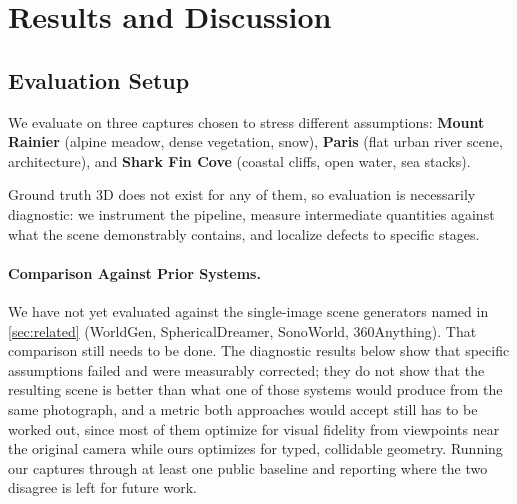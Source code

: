 \section{Results and Discussion}
\label{sec:results}

\subsection{Evaluation Setup}

We evaluate on three captures chosen to stress different assumptions:
\textbf{Mount Rainier} (alpine meadow, dense vegetation, snow),
\textbf{Paris} (flat urban river scene, architecture), and
\textbf{Shark Fin Cove} (coastal cliffs, open water, sea stacks).

Ground truth 3D does not exist for any of them, so evaluation is necessarily
diagnostic: we instrument the pipeline, measure intermediate quantities against
what the scene demonstrably contains, and localize defects to specific stages.

\paragraph{Comparison Against Prior Systems.} We have not yet evaluated against the
single-image scene generators named in \cref{sec:related} (WorldGen,
SphericalDreamer, SonoWorld, 360Anything). That comparison still needs to be done.
The diagnostic results below show that specific assumptions failed and were
measurably corrected; they do not show that the resulting scene is better than
what one of those systems would produce from the same photograph, and a metric
both approaches would accept still has to be worked out, since most of them
optimize for visual fidelity from viewpoints near the original camera while ours
optimizes for typed, collidable geometry. Running our captures through at least
one public baseline and reporting where the two disagree is left for future work.

